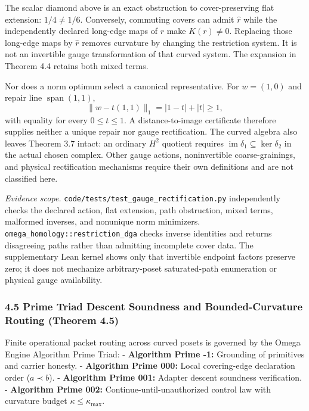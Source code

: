 \documentclass[
  english,
  10pt,
  a4paper,
]{article}
\begin{document}
The scalar diamond above is an exact obstruction to cover-preserving
flat extension: \(1/4\ne1/6\). Conversely, commuting covers can admit
\(\widehat r\) while the independently declared long-edge maps of \(r\)
make \(K(r)\ne0\). Replacing those long-edge maps by \(\widehat r\)
removes curvature by changing the restriction system. It is not an
invertible gauge transformation of that curved system. The expansion in
Theorem 4.4 retains both mixed terms.

Nor does a norm optimum select a canonical representative. For
\(w=(1,0)\) and repair line \(\operatorname{span}(1,1)\), \[
\|w-t(1,1)\|_1=|1-t|+|t|\ge1,
\] with equality for every \(0\le t\le1\). A distance-to-image
certificate therefore supplies neither a unique repair nor gauge
rectification. The curved algebra also leaves Theorem 3.7 intact: an
ordinary \(H^2\) quotient requires
\(\operatorname{im}\delta_1\subseteq\ker\delta_2\) in the actual chosen
complex. Other gauge actions, noninvertible coarse-grainings, and
physical rectification mechanisms require their own definitions and are
not classified here.

\emph{Evidence scope.}
\nolinkurl{code/tests/test_gauge_rectification.py} independently checks
the declared action, flat extension, path obstruction, mixed terms,
malformed inverses, and nonunique norm minimizers.
\nolinkurl{omega_homology::restriction_dga} checks inverse identities
and returns disagreeing paths rather than admitting incomplete cover
data. The supplementary Lean kernel shows only that invertible endpoint
factors preserve zero; it does not mechanize arbitrary-poset
saturated-path enumeration or physical gauge availability.

\subsubsection{4.5 Prime Triad Descent Soundness and Bounded-Curvature
Routing (Theorem
4.5)}\label{prime-triad-descent-soundness-and-bounded-curvature-routing-theorem-4.5}

Finite operational packet routing across curved posets is governed by
the Omega Engine Algorithm Prime Triad: - \textbf{Algorithm Prime -1:}
Grounding of primitives and carrier honesty. - \textbf{Algorithm Prime
000:} Local covering-edge declaration order (\(a \prec b\)). -
\textbf{Algorithm Prime 001:} Adapter descent soundness verification. -
\textbf{Algorithm Prime 002:} Continue-until-unauthorized control law
with curvature budget \(\kappa \le \kappa_{\max}\).
\end{document}
